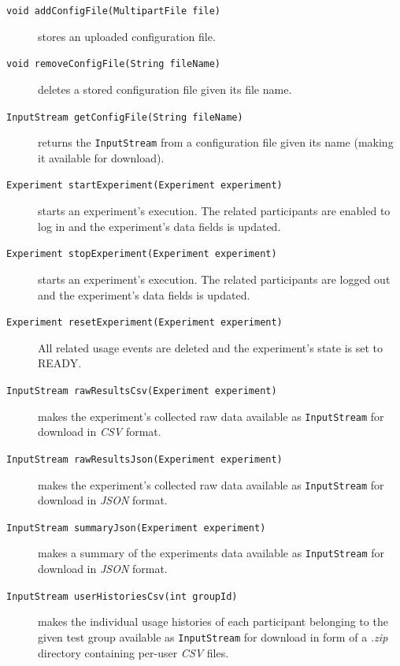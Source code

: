 \documentclass[a4paper]{usiinfbachelorproject}
\begin{document}
\begin{description}
        \item[\texttt{void addConfigFile(MultipartFile file)}] stores an uploaded configuration file.

        \item[\texttt{void removeConfigFile(String fileName)}] deletes a stored configuration file given its file name.

        \item[\texttt{InputStream getConfigFile(String fileName)}] returns the \texttt{InputStream} from a configuration file given its name 
                    (making it available for download).

        \item[\texttt{Experiment startExperiment(Experiment experiment)}] starts an experiment's execution. The related participants are enabled
                    to log in and the experiment's data fields is updated.

        \item[\texttt{Experiment stopExperiment(Experiment experiment)}] starts an experiment's execution. The related participants are 
                    logged out and the experiment's data fields is updated.

        \item[\texttt{Experiment resetExperiment(Experiment experiment)}] All related usage events are deleted
	                and the experiment's state is set to READY.

        \item[\texttt{InputStream rawResultsCsv(Experiment experiment)}] makes the experiment's collected raw data available
                    as \texttt{InputStream} for download in \emph{CSV} format.

        \item[\texttt{InputStream rawResultsJson(Experiment experiment)}] makes the experiment's collected raw data available
                    as \texttt{InputStream} for download in \emph{JSON} format.

        \item[\texttt{InputStream summaryJson(Experiment experiment)}] makes a summary of the experiments data
                    available as \texttt{InputStream} for download in \emph{JSON} format.

        \item[\texttt{InputStream userHistoriesCsv(int groupId)}] makes the individual usage histories of each participant
                    belonging to the given test group available as \texttt{InputStream} for download in form of a \emph{.zip}
                    directory containing per-user \emph{CSV} files.


\end{description}
\end{document}
